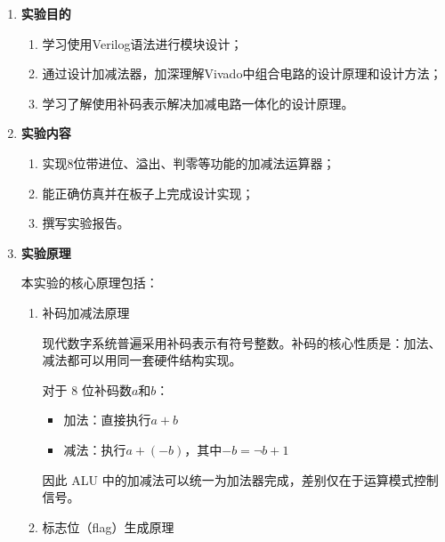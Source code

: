 \documentclass{SYSUReport}
\date{\today}
\begin{document}
\cover
\thispagestyle{empty} %
\clearpage

\setcounter{page}{1}



\begin{enumerate}[label={\chinese*、},labelsep=0pt]
    \item \textbf{实验目的}
    \begin{enumerate}[label = \arabic*、]
        \item 学习使用Verilog语法进行模块设计；
        \item 通过设计加减法器，加深理解Vivado中组合电路的设计原理和设计方法；
        \item 学习了解使用补码表示解决加减电路一体化的设计原理。
    \end{enumerate}

    \item \textbf{实验内容}
    \begin{enumerate}[label = \arabic*、]
        \item 实现8位带进位、溢出、判零等功能的加减法运算器；
        \item 能正确仿真并在板子上完成设计实现；
        \item 撰写实验报告。
    \end{enumerate}

    \item \textbf{实验原理}
    
    本实验的核心原理包括：
    \begin{enumerate}[label = \arabic*、]
        \item 补码加减法原理
        
        现代数字系统普遍采用补码表示有符号整数。补码的核心性质是：加法、减法都可以用同一套硬件结构实现。

        对于 8 位补码数$a$和$b$：
        \begin{itemize}
            \item 加法：直接执行$a+b$
            \item 减法：执行$a+(-b)$，其中$-b=\lnot b + 1 $
        \end{itemize}
        因此 ALU 中的加减法可以统一为加法器完成，差别仅在于运算模式控制信号。

        \item 标志位（flag）生成原理
        

\end{enumerate}
\end{enumerate}
\end{document}
